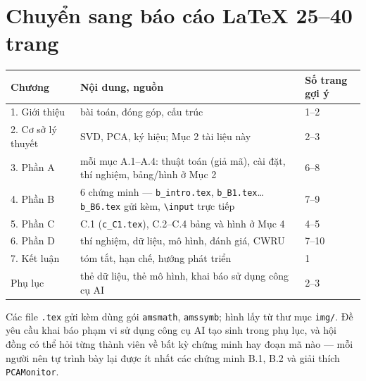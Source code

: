 \documentclass[11pt,a4paper]{article}
\newcommand{\code}[1]{\texttt{#1}}
\begin{document}
\section{Chuyển sang báo cáo LaTeX 25–40 trang}
\begin{center}
\renewcommand{\arraystretch}{1.2}
\begin{tabularx}{\linewidth}{@{}l>{\raggedright}p{7cm}X@{}}
\toprule
\textbf{Chương} & \textbf{Nội dung, nguồn} & \textbf{Số trang gợi ý} \\
\midrule
1. Giới thiệu & bài toán, đóng góp, cấu trúc & 1–2 \\
2. Cơ sở lý thuyết & SVD, PCA, ký hiệu; Mục 2 tài liệu này & 2–3 \\
3. Phần A & mỗi mục A.1–A.4: thuật toán (giả mã), cài đặt, thí nghiệm, bảng/hình ở Mục 2 & 6–8 \\
4. Phần B & 6 chứng minh — \code{b\_intro.tex}, \code{b\_B1.tex}…\code{b\_B6.tex} gửi kèm, \code{\textbackslash input} trực tiếp & 7–9 \\
5. Phần C & C.1 (\code{c\_C1.tex}), C.2–C.4 bảng và hình ở Mục 4 & 4–5 \\
6. Phần D & thí nghiệm, dữ liệu, mô hình, đánh giá, CWRU & 7–10 \\
7. Kết luận & tóm tắt, hạn chế, hướng phát triển & 1 \\
Phụ lục & thẻ dữ liệu, thẻ mô hình, khai báo sử dụng công cụ AI & 2–3 \\
\bottomrule
\end{tabularx}
\end{center}
Các file \code{.tex} gửi kèm dùng gói \code{amsmath}, \code{amssymb}; hình lấy từ thư mục \code{img/}. Đề yêu cầu khai báo phạm vi sử dụng công cụ AI tạo sinh trong phụ lục, và hội đồng có thể hỏi từng thành viên về bất kỳ chứng minh hay đoạn mã nào — mỗi người nên tự trình bày lại được ít nhất các chứng minh B.1, B.2 và giải thích \code{PCAMonitor}.

\end{document}
